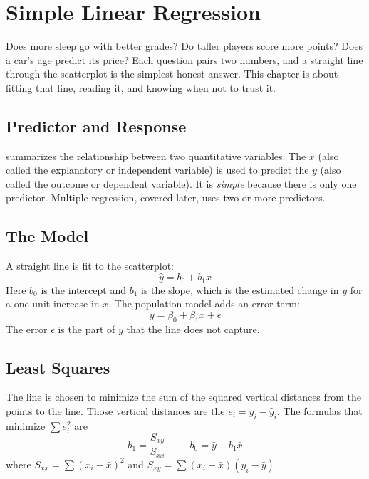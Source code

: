\chapter{Simple Linear Regression}

Does more sleep go with better grades? Do taller players score more points?
Does a car's age predict its price? Each question pairs two numbers, and a
straight line through the scatterplot is the simplest honest answer. This
chapter is about fitting that line, reading it, and knowing when not to trust it.

\section{Predictor and Response}
 summarizes the relationship between two
quantitative variables. The  $x$
(also called the explanatory or independent variable) is used to predict the
 $y$ (also called the outcome or
dependent variable). It is \emph{simple} because there is only one predictor.
Multiple regression, covered later, uses two or more predictors.

\section{The Model}
A straight line is fit to the scatterplot:
$$\hat{y} = b_0 + b_1 x$$
Here $b_0$ is the intercept and $b_1$ is the slope, which is the estimated
change in $y$ for a one-unit increase in $x$. The population model adds an error term:
$$y = \beta_0 + \beta_1 x + \epsilon$$
The error $\epsilon$ is the part of $y$ that the line does not capture.

\section{Least Squares}
The line is chosen to minimize the sum of the squared vertical distances from the
points to the line. Those vertical distances are the 
$e_i = y_i - \hat{y}_i$. The formulas that minimize $\sum e_i^2$ are
$$b_1 = \frac{S_{xy}}{S_{xx}}, \qquad b_0 = \bar{y} - b_1 \bar{x}$$
where $S_{xx} = \sum (x_i - \bar{x})^2$ and $S_{xy} = \sum (x_i - \bar{x})(y_i - \bar{y})$.

